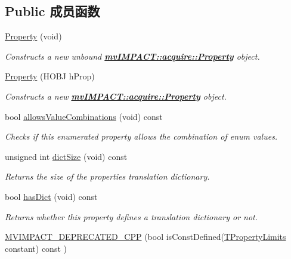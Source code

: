 \subsection*{Public 成员函数}
\begin{DoxyCompactItemize}
\item 
\hyperlink{classmv_i_m_p_a_c_t_1_1acquire_1_1_property_a32769caf6b712dea6fd583aadb37c641}{Property} (void)
\begin{DoxyCompactList}\small\item\em Constructs a new unbound {\bfseries \hyperlink{classmv_i_m_p_a_c_t_1_1acquire_1_1_property}{mv\+I\+M\+P\+A\+C\+T\+::acquire\+::\+Property}} object. \end{DoxyCompactList}\item 
\hyperlink{classmv_i_m_p_a_c_t_1_1acquire_1_1_property_ab7f6c3efdcef31a840b52ddd35ec1b31}{Property} (H\+O\+B\+J h\+Prop)
\begin{DoxyCompactList}\small\item\em Constructs a new {\bfseries \hyperlink{classmv_i_m_p_a_c_t_1_1acquire_1_1_property}{mv\+I\+M\+P\+A\+C\+T\+::acquire\+::\+Property}} object. \end{DoxyCompactList}\item 
bool \hyperlink{classmv_i_m_p_a_c_t_1_1acquire_1_1_property_a098821f15ac08dbcd48af11b96ce8284}{allows\+Value\+Combinations} (void) const 
\begin{DoxyCompactList}\small\item\em Checks if this enumerated property allows the combination of enum values. \end{DoxyCompactList}\item 
unsigned int \hyperlink{classmv_i_m_p_a_c_t_1_1acquire_1_1_property_ab47d418329e2422053fec56c8d316f17}{dict\+Size} (void) const 
\begin{DoxyCompactList}\small\item\em Returns the size of the properties translation dictionary. \end{DoxyCompactList}\item 
bool \hyperlink{classmv_i_m_p_a_c_t_1_1acquire_1_1_property_a914eb2e3931822d4709543919899def3}{has\+Dict} (void) const 
\begin{DoxyCompactList}\small\item\em Returns whether this property defines a translation dictionary or not. \end{DoxyCompactList}\item 
\hyperlink{classmv_i_m_p_a_c_t_1_1acquire_1_1_property_a12b00c261f6b436ee85eea1ec5573dd9}{M\+V\+I\+M\+P\+A\+C\+T\+\_\+\+D\+E\+P\+R\+E\+C\+A\+T\+E\+D\+\_\+\+C\+P\+P} (bool is\+Const\+Defined(\hyperlink{group___common_interface_gab31a9721792e36b8c256a769961df4f9}{T\+Property\+Limits} constant) const )

\end{DoxyCompactItemize}
